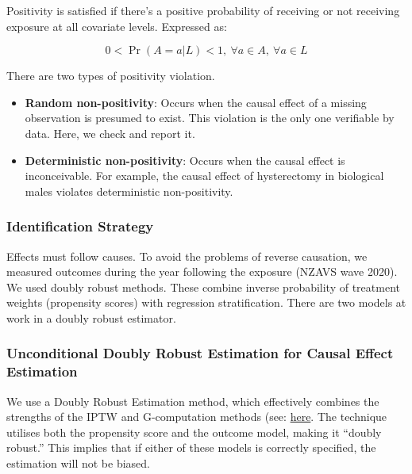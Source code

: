 \documentclass[
  letterpaper,
  DIV=11,
  numbers=noendperiod]{scrartcl}
\begin{document}
Positivity is satisfied if there's a positive probability of receiving
or not receiving exposure at all covariate levels. Expressed as:

\begin{equation}
0 < \Pr(A=a|L)<1, ~ \forall a \in A, ~ \forall a \in L
\end{equation}

There are two types of positivity violation.

\begin{itemize}
\item
  \textbf{Random non-positivity}: Occurs when the causal effect of a
  missing observation is presumed to exist. This violation is the only
  one verifiable by data. Here, we check and report it.
\item
  \textbf{Deterministic non-positivity}: Occurs when the causal effect
  is inconceivable. For example, the causal effect of hysterectomy in
  biological males violates deterministic non-positivity.
\end{itemize}

\hypertarget{identification-strategy}{%
\subsubsection{Identification Strategy}\label{identification-strategy}}

Effects must follow causes. To avoid the problems of reverse causation,
we measured outcomes during the year following the exposure (NZAVS wave
2020). We used doubly robust methods. These combine inverse probability
of treatment weights (propensity scores) with regression stratification.
There are two models at work in a doubly robust estimator.

\hypertarget{unconditional-doubly-robust-estimation-for-causal-effect-estimation}{%
\subsubsection{Unconditional Doubly Robust Estimation for Causal Effect
Estimation}\label{unconditional-doubly-robust-estimation-for-causal-effect-estimation}}

We use a Doubly Robust Estimation method, which effectively combines the
strengths of the IPTW and G-computation methods (see:
\href{https://go-bayes.github.io/psych-434-2023/content/09-content.html\#comprehensive-checklist-for-detailed-reporting-of-a-causal-inferenctial-study-e.g.-assessment-3-option-2}{here}.
The technique utilises both the propensity score and the outcome model,
making it ``doubly robust.'' This implies that if either of these models
is correctly specified, the estimation will not be biased.
\end{document}
